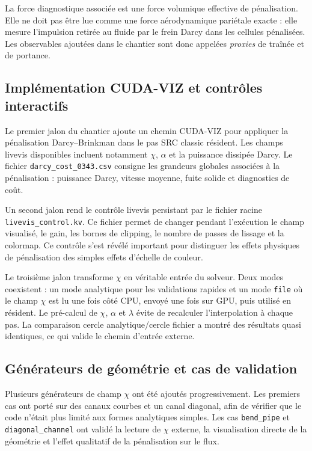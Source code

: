 \documentclass[11pt,a4paper]{article}
\begin{document}
La force diagnostique associée est une force volumique effective de pénalisation. Elle ne doit pas être lue comme une force aérodynamique pariétale exacte : elle mesure l'impulsion retirée au fluide par le frein Darcy dans les cellules pénalisées. Les observables ajoutées dans le chantier sont donc appelées \emph{proxies} de traînée et de portance.

\subsection{Implémentation CUDA-VIZ et contrôles interactifs}

Le premier jalon du chantier ajoute un chemin CUDA-VIZ pour appliquer la pénalisation Darcy--Brinkman dans le pas SRC classic résident. Les champs livevis disponibles incluent notamment $\chi$, $\alpha$ et la puissance dissipée Darcy. Le fichier \texttt{darcy\_cost\_0343.csv} consigne les grandeurs globales associées à la pénalisation : puissance Darcy, vitesse moyenne, fuite solide et diagnostics de coût.

Un second jalon rend le contrôle livevis persistant par le fichier racine \texttt{livevis\_control.kv}. Ce fichier permet de changer pendant l'exécution le champ visualisé, le gain, les bornes de clipping, le nombre de passes de lissage et la colormap. Ce contrôle s'est révélé important pour distinguer les effets physiques de pénalisation des simples effets d'échelle de couleur.

Le troisième jalon transforme $\chi$ en véritable entrée du solveur. Deux modes coexistent : un mode analytique pour les validations rapides et un mode \texttt{file} où le champ $\chi$ est lu une fois côté CPU, envoyé une fois sur GPU, puis utilisé en résident. Le pré-calcul de $\chi$, $\alpha$ et $\lambda$ évite de recalculer l'interpolation à chaque pas. La comparaison cercle analytique/cercle fichier a montré des résultats quasi identiques, ce qui valide le chemin d'entrée externe.

\subsection{Générateurs de géométrie et cas de validation}

Plusieurs générateurs de champ $\chi$ ont été ajoutés progressivement. Les premiers cas ont porté sur des canaux courbes et un canal diagonal, afin de vérifier que le code n'était plus limité aux formes analytiques simples. Les cas \texttt{bend\_pipe} et \texttt{diagonal\_channel} ont validé la lecture de $\chi$ externe, la visualisation directe de la géométrie et l'effet qualitatif de la pénalisation sur le flux.
\end{document}
